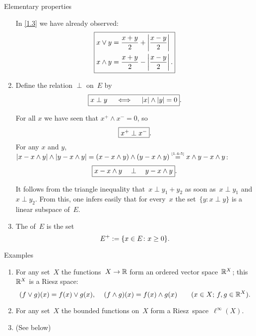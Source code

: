 \documentclass[main.tex]{subfiles}
\begin{document}
\begin{psec}{Elementary properties}
\begin{enumerate}
In \ref{1.3} 
we have already observed:
\[ \fbox{$ 
\begin{aligned}
x \vee y 
  &= \frac{x+y}{2} + \left | \frac{x-y}{2} \right | \\
x \wedge y 
  &= \frac{x+y}{2} - \left | \frac{x-y}{2} \right | 
\textnormal{.}
\end{aligned}  $} \]
%
\item
\label{1.4-11}
Define the relation $\perp$ on~$E$ by
\begin{equation*}
\fbox{$ x \perp y \quad \iff \quad |x|\wedge|y|=0 $}
\textnormal{.}
\end{equation*}

For all $x$ we have seen that $x^+\wedge x^- = 0$,
so
\begin{equation*}
\fbox{$ x^+ \perp x^- $}
\textnormal{.}
\end{equation*}
For any $x$ and $y$, 
$|x-x\wedge y|\wedge|y-x\wedge y|
=(x-x\wedge y) \wedge (y-x\wedge y)
\isref{1.4-5} x\wedge y - x\wedge y$:
\begin{equation*}
\fbox{$ x-x\wedge y \quad \perp \quad y- x\wedge y $}
\textnormal{.}
\end{equation*}

It follows from the triangle inequality
 that~$x\perp y_1 + y_2$
as soon as~$x\perp y_1$ and $x\perp y_2$.
From this,
one infers easily that for every~$x$
the set~$\{ y: x\perp y\}$
is a linear subspace of~$E$.
%
\item \label{1.14-12}
The  of~$E$ is the set
\begin{equation*}
E^+ := \{x\in E\colon x\ge 0\}
\textnormal{.}
\end{equation*}
\end{enumerate}
\end{psec}
%
%
%
%
\begin{psec}{Examples}
\label{1.5}
\begin{enumerate}
\item
\label{1.5-1}
For any set~$X$
the functions~$X\rightarrow \mathbb{R}$
form an ordered vector space~$\mathbb{R}^X$;
this~$\mathbb{R}^X$ is a Riesz space:
\begin{equation*}
(f\vee g)(x) = f(x)\vee g(x)\textnormal{, } \quad 
(f\wedge g)(x) = f(x)\wedge g(x)\qquad
(x\in X\textnormal{; }f,g\in\mathbb{R}^X)
\textnormal{.}
\end{equation*}
%
\item
\label{1.5-2}
For any set~$X$ the bounded functions on~$X$ form a 
Riesz~space~$\ell^\infty(X)$.
%
\setcounter{list-1.5}{\value{enumi}}
\item
(See below)
\end{enumerate}
\end{psec}
\end{document}
